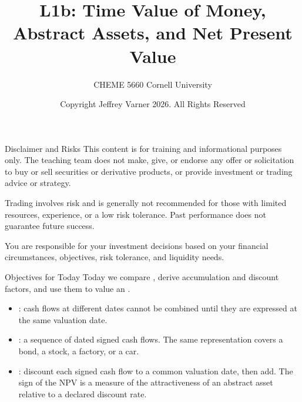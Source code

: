 \documentclass[aspectratio=169,11pt]{beamer}
\title{{\vnheavy L1b}: Time Value of Money, Abstract Assets, and Net Present Value}
\subtitle{CHEME 5660 Cornell University}
\author{Copyright Jeffrey Varner 2026. All Rights Reserved}
\begin{document}
\vntitlepage

\begin{frame}{Disclaimer and Risks}
  \vspace{0.6em}
  \textbf{} This content is for training and informational
  purposes only. The teaching team does not make, give, or endorse any offer or
  solicitation to buy or sell securities or derivative products, or provide
  investment or trading advice or strategy.

  \vspace{1.1em}
  \textbf{} Trading involves risk and is generally not recommended for
  those with limited resources, experience, or a low risk tolerance. Past
  performance does not guarantee future success.

  \vspace{1.1em}
  \textbf{} You are responsible for your investment decisions
  based on your financial circumstances, objectives, risk tolerance, and
  liquidity needs.
\end{frame}

\begin{frame}{Objectives for Today}
  \vspace{0.4em}
  Today we compare , derive accumulation
  and discount factors, and use them to value an .

  \vspace{0.9em}
  \vspace{0.4em}
  \begin{itemize}\setlength{\itemsep}{0.5em}
    \item {}: cash flows at different dates cannot
      be combined until they are expressed at the same valuation date.
    \item {}: a sequence of dated signed cash flows. The
      same representation covers a bond, a stock, a factory, or a car.
    \item {}: discount each signed cash flow to a common
      valuation date, then add. The sign of the NPV is a measure of the attractiveness of an abstract asset relative to a declared discount rate.
  \end{itemize}
  \vspace{-0.4em}

\end{frame}
\end{document}
